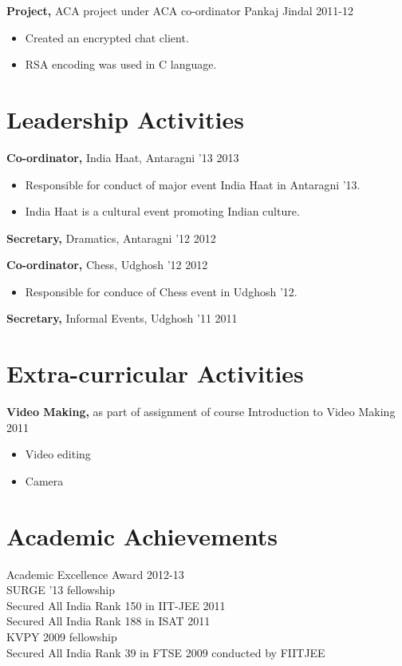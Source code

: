 \documentclass[margin]{res}
\begin{document}
\begin{resume}
 {\bf Project,} ACA project under ACA co-ordinator Pankaj Jindal \hfill 2011-12
 \begin{itemize} \itemsep -2pt  %
 \item Created an encrypted chat client.
 \item RSA encoding was used in C language.
 \end{itemize}

 
 

\section{Leadership Activities} 
               {\bf Co-ordinator,} India Haat, Antaragni '13    \hfill         2013
          \begin{itemize}\itemsep -2pt
          
          
               \item Responsible for conduct of major event India Haat in Antaragni '13.
               \item India Haat is a cultural event promoting Indian culture.
          \end{itemize}
          
        {\bf Secretary,} Dramatics, Antaragni '12 \hfill 2012

		{\bf Co-ordinator,} Chess, Udghosh '12 \hfill   2012 
                \begin{itemize} \itemsep -2pt
                 \item  Responsible for conduce of Chess event in Udghosh '12.
                  \end{itemize}
        {\bf Secretary,} Informal Events, Udghosh '11 \hfill 2011
                
\section{Extra-curricular Activities}
		{\bf Video Making,} as part of assignment of course Introduction to Video Making \hfill 2011
		\begin{itemize} \itemsep -2pt
			\item Video editing
			\item Camera
			
		\end{itemize}
		
\section{Academic Achievements} 
Academic Excellence Award 2012-13 \\
SURGE '13 fellowship \\
Secured All India Rank 150 in IIT-JEE 2011 \\
Secured All India Rank 188 in ISAT 2011 \\
KVPY 2009 fellowship \\
Secured All India Rank 39 in FTSE 2009 conducted by FIITJEE



\end{resume}
\end{document}
